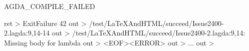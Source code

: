 AGDA_COMPILE_FAILED

ret > ExitFailure 42 out > /test/LaTeXAndHTML/succeed/Issue2400-2.lagda:9,14-14 out > /test/LaTeXAndHTML/succeed/Issue2400-2.lagda:9,14: Missing body for lambda out > <EOF><ERROR> out > ... out >